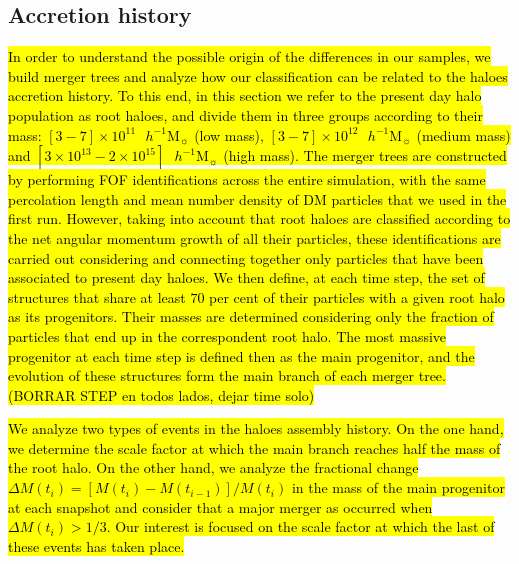 \documentclass[fleqn,usenatbib]{mnras}
\newcommand{\hMsun}{{\textrm{ $h^{-1}$M$_{\sun}$}}}
\begin{document}
\subsection{Accretion history}
\hl{In order to understand the possible origin of the differences in our samples, we build merger trees and analyze how our classification can be related to the haloes accretion history. To this end, in this section we refer to the present day halo population as root haloes, and divide them in three groups according to their mass: $[3 - 7]\times10^{11}\hMsun$ (low mass), $[3 - 7]\times10^{12}\hMsun$ (medium mass) and $[3\times10^{13} - 2\times10^{15}]\hMsun$ (high mass).
The merger trees are constructed by performing FOF identifications across the entire simulation, with the same percolation length and mean number density of DM particles that we used in the first run.
However, taking into account that root haloes are classified according to the net angular momentum growth of all their particles, these identifications are carried out considering and connecting together only particles that have been associated to present day haloes. We then define, at each time step, the set of structures that share at least $70$ per cent of their particles with a given root halo as its progenitors. Their masses are determined considering only the fraction of particles that end up in the correspondent root halo. The most massive progenitor at each time step is defined then as the main progenitor, and the evolution of these structures form the main branch of each merger tree.(BORRAR STEP en todos lados, dejar time solo)}

\hl{We analyze two types of events in the haloes assembly history. On the one hand, we determine the scale factor at which the main branch reaches half the mass of the root halo. On the other hand, we analyze the fractional change $\Delta M(t_i)=[M(t_i)-M(t_{i-1})]/M(t_i)$ in the mass of the main progenitor at each snapshot and consider that a major merger as occurred when $\Delta M(t_i)>1/3$. Our interest is focused on the scale factor at which the last of these events has taken place.}
\end{document}
